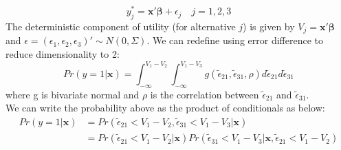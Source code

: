 \documentclass[DIV=14,titlepage=false]{scrreprt}
\begin{document}
\begin{example}
    \[
        y^*_j = \mathbf{x' \beta} + \epsilon_j \quad j = 1,2,3
    \]
    The deterministic component of utility (for alternative $j$) is given by $V_j = \mathbf{x' \beta}$ and $\epsilon = (\epsilon_1, \epsilon_2, \epsilon_3)' \sim N(0, \Sigma)$. We can redefine using error difference to reduce dimensionality to 2:
    \[
        Pr(y = 1|\mathbf{x}) = \int_{-\infty}^{V_1-V_2} \int_{-\infty}^{V_1-V_3} g(\tilde \epsilon_{21}, \tilde \epsilon_{31}, \rho) d\tilde \epsilon_{21} d\tilde \epsilon_{31}
    \]
    where g is bivariate normal and $\rho$ is the correlation between $\tilde \epsilon_{21}$ and $\tilde \epsilon_{31}$.\\
    We can write the probability above as the product of conditionals as below:
    \begin{align*}
        Pr(y=1|\mathbf{x}) &= Pr(\tilde \epsilon_{21} < V_1 - V_2, \tilde \epsilon_{31} < V_1 - V_3|\mathbf{x})\\
        &= Pr(\tilde \epsilon_{21} < V_1 - V_2|\mathbf{x}) Pr(\tilde \epsilon_{31} < V_1 - V_3 |\mathbf{x}, \tilde \epsilon_{21} < V_1 - V_2) 
    \end{align*}


\end{example}
\end{document}
